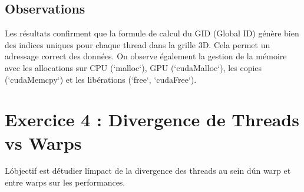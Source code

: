 \documentclass[a4paper,11pt]{article}
\begin{document}
\subsection{Observations}
Les résultats confirment que la formule de calcul du GID (Global ID) génère bien des indices uniques pour chaque thread dans la grille 3D. Cela permet un adressage correct des données. On observe également la gestion de la mémoire avec les allocations sur CPU (`malloc`), GPU (`cudaMalloc`), les copies (`cudaMemcpy`) et les libérations (`free`, `cudaFree`).

\section{Exercice 4 : Divergence de Threads vs Warps}
L\'objectif est d\'étudier l\'impact de la divergence des threads au sein d\'un warp et entre warps sur les performances.
\end{document}

